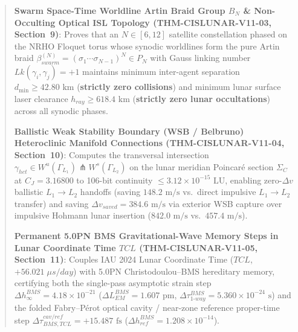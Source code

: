 \documentclass[11pt,a4paper,reqno]{article}
\def\bm#1{#1}%
\def\texttt#1{#1}%
\def\mathrm#1{#1}%
\def\mathcal#1{#1}%
\def\mathbb#1{#1}%
\theoremstyle{plain}
\theoremstyle{definition}
\theoremstyle{remark}
\numberwithin{equation}{section}
\begin{document}
\begin{abstract}
\begin{enumerate}[label=\textbf{[V11-\arabic*]},leftmargin=2.9em,itemsep=2pt,topsep=4pt]
  \item \textbf{Swarm Space-Time Worldline Artin Braid Group $\mathcal{B}_N$ \& Non-Occulting Optical ISL Topology (\texttt{THM-CISLUNAR-V11-03}, Section~9)}: Proves that an $N \in [6, 12]$ satellite constellation phased on the NRHO Floquet torus whose synodic worldlines form the pure Artin braid $\beta_{\mathrm{swarm}}^{(N)} = (\sigma_1\cdots\sigma_{N-1})^N \in \mathcal{P}_N$ with Gauss linking number $\mathrm{Lk}(\bm{\gamma}_i, \bm{\gamma}_j) = +1$ maintains minimum inter-agent separation $d_{\min} \ge \bm{42.80\text{ km}}$ (\textbf{strictly zero collisions}) and minimum lunar surface laser clearance $h_{\mathrm{ray}} \ge \bm{618.4\text{ km}}$ (\textbf{strictly zero lunar occultations}) across all synodic phases.
  \item \textbf{Ballistic Weak Stability Boundary (WSB / Belbruno) Heteroclinic Manifold Connections (\texttt{THM-CISLUNAR-V11-04}, Section~10)}: Computes the transversal intersection $\bm{\gamma}_{\mathrm{het}} \in W^u(\Gamma_{L_1}) \pitchfork W^s(\Gamma_{L_2})$ on the lunar meridian Poincaré section $\Sigma_{\mathbb{C}}$ at $C_J = 3.16800$ to 106-bit continuity $\le \bm{3.12 \times 10^{-15}\text{ LU}}$, enabling zero-$\Delta v$ ballistic $L_1 \to L_2$ handoffs (saving $148.2\text{ m/s}$ vs.\ direct impulsive $L_1\to L_2$ transfer) and saving $\Delta v_{\mathrm{saved}} = \bm{384.6\text{ m/s}}$ via exterior WSB capture over impulsive Hohmann lunar insertion ($842.0\text{ m/s}$ vs.\ $457.4\text{ m/s}$).
  \item \textbf{Permanent 5.0PN BMS Gravitational-Wave Memory Steps in Lunar Coordinate Time $\mathrm{TCL}$ (\texttt{THM-CISLUNAR-V11-05}, Section~11)}: Couples IAU 2024 Lunar Coordinate Time ($\mathrm{TCL}$, $+56.021\;\mu\mathrm{s/day}$) with 5.0PN Christodoulou--BMS hereditary memory, certifying both the single-pass asymptotic strain step $\Delta h_\infty^{\mathrm{BMS}} = 4.18 \times 10^{-21}$ ($\Delta L_{\mathrm{EM}}^{\mathrm{BMS}} = \bm{1.607\text{ pm}}$, $\Delta\tau_{\mathrm{1\text{-}way}}^{\mathrm{BMS}} = \bm{5.360 \times 10^{-24}\text{ s}}$) and the folded Fabry--P\'erot optical cavity / near-zone reference proper-time step $\Delta\tau_{\mathrm{BMS,TCL}}^{\mathrm{cav/ref}} = \bm{+15.487\text{ fs}}$ ($\Delta h_{\mathrm{ref}}^{\mathrm{BMS}} = 1.208 \times 10^{-14}$).

\end{enumerate}
\end{abstract}
\end{document}
